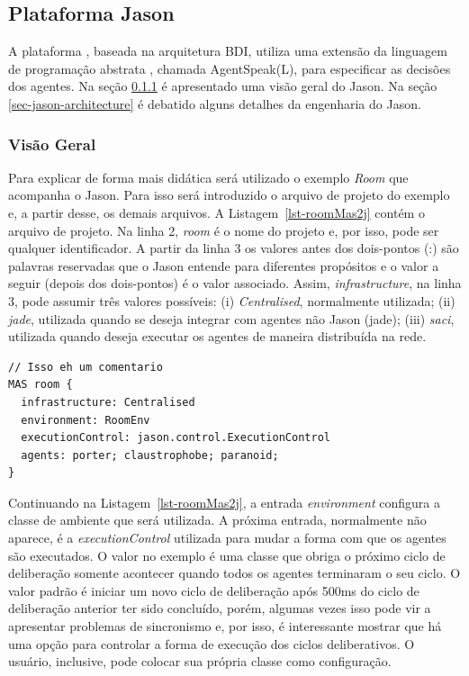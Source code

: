 \subsection{Plataforma Jason}

A plataforma \jason \cite{bordini-jason}, baseada na arquitetura BDI,
utiliza uma extensão da linguagem de programação abstrata \cite{rao1996agentspeak},
 chamada AgentSpeak(L), para especificar as decisões
dos agentes. Na seção \ref{sec-jason-overview} é apresentado uma
visão geral do Jason. Na seção \ref{sec-jason-architecture} é
debatido alguns detalhes da engenharia do Jason.

\subsubsection{Visão Geral} \label{sec-jason-overview}

Para explicar de forma mais didática será utilizado o
exemplo \emph{Room} que acompanha o Jason. Para isso será introduzido
o arquivo de projeto do exemplo e, a partir desse, os demais arquivos.
A Listagem~\ref{lst-roomMas2j} contém o arquivo de projeto.
Na linha 2, \emph{room} é o nome do projeto e, por isso, pode ser qualquer
identificador. A partir da linha 3 os valores antes dos dois-pontos (:)
são palavras reservadas que o Jason entende para diferentes propósitos e o valor
a seguir (depois dos dois-pontos) é o valor associado.
Assim, \emph{infrastructure}, na linha 3, pode assumir três valores
possíveis: (i) \emph{Centralised}, normalmente utilizada;
(ii) \emph{jade}, utilizada quando se deseja integrar
com agentes não Jason (jade); (iii) \emph{saci}, utilizada
quando deseja executar os agentes de maneira distribuída na rede.

\begin{center}
    \begin{minipage}{120mm}
	\begin{lstlisting}[frame=trbl, caption=Arquivo de projeto do Jason para o exemplo \emph{Room}, label=lst-roomMas2j]
// Isso eh um comentario
MAS room {
  infrastructure: Centralised
  environment: RoomEnv
  executionControl: jason.control.ExecutionControl
  agents: porter; claustrophobe; paranoid;
}
	\end{lstlisting}
    \end{minipage}
\end{center}

Continuando na Listagem~\ref{lst-roomMas2j}, a entrada \emph{environment}
configura a classe de ambiente que será utilizada. A próxima entrada,
normalmente não aparece, é a \emph{executionControl} utilizada para
mudar a forma com que os agentes são executados. O valor no exemplo é uma
classe que obriga o próximo ciclo de deliberação somente acontecer quando
todos os agentes terminaram o seu ciclo. O valor padrão é iniciar um novo
ciclo de deliberação após 500ms do ciclo de deliberação anterior ter sido
concluído, porém, algumas vezes isso
pode vir a apresentar problemas de sincronismo e, por isso, é interessante
mostrar que há uma opção para controlar a forma de execução dos ciclos
deliberativos. O usuário, inclusive, pode colocar sua própria classe como
configuração.

